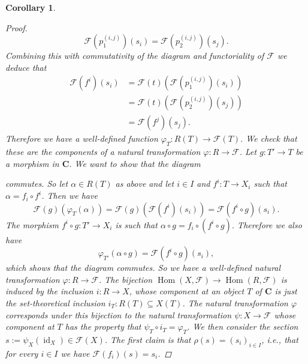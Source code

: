 \documentclass[12pt,reqno,a4paper]{amsart}
\theoremstyle{plain}
\newtheorem{cor}[thm]{Corollary}
\theoremstyle{definition}
\theoremstyle{remark}
\begin{document}
\begin{cor}
\begin{proof}
    \[ \mathscr{F}(p_{1}^{(i,j)})(s_{i}) = \mathscr{F}(p_{2}^{(i,j)})(s_{j}). \]
    Combining this with commutativity of the diagram and functoriality of $\mathscr{F}$ we deduce that
    \begin{align*}
      \mathscr{F}(f^{i})(s_{i}) & = \mathscr{F}(t)(\mathscr{F}(p_{1}^{(i,j)})(s_{i})) \\
      & = \mathscr{F}(t)(\mathscr{F}(p_{2}^{(i,j)})(s_{j})) \\
      & = \mathscr{F}(f^{j})(s_{j}).
    \end{align*}
    Therefore we have a well-defined function $\varphi_{T} \colon R(T) \to \mathscr{F}(T)$.
    We check that these are the components of a natural transformation $\varphi \colon R \to \mathscr{F}$.
    Let $g \colon T' \to T$ be a morphism in $\mathbf{C}$.
    We want to show that the diagram
    \begin{center}
    \end{center}
    commutes.
    So let $\alpha \in R(T)$ as above and let $i \in I$ and $f^{i} \colon T \to X_{i}$ such that $\alpha = f_{i} \circ f^{i}$.
    Then we have
    \[ \mathscr{F}(g)(\varphi_{T}(\alpha)) = \mathscr{F}(g)(\mathscr{F}(f^{i})(s_{i})) = \mathscr{F}(f^{i}\circ g)(s_{i}). \]
    The morphism $f^{i} \circ g \colon T' \to X_{i}$ is such that $\alpha \circ g= f_{i} \circ (f^{i} \circ g)$.
    Therefore we also have
    \[ \varphi_{T'}(\alpha \circ g) = \mathscr{F}(f^{i} \circ g)(s_{i}), \]
    which shows that the diagram commutes.
    So we have a well-defined natural transformation $\varphi \colon R \to \mathscr{F}$.
    The bijection $\operatorname{Hom}(X,\mathscr{F}) \to \operatorname{Hom}(R,\mathscr{F})$ is induced by the inclusion $i \colon R \to X$, whose component at an object $T$ of $\mathbf{C}$ is just the set-theoretical inclusion $i_{T} \colon R(T) \subseteq X(T)$.
    The natural transformation $\varphi$ corresponds under this bijection to the natural transformation $\psi \colon X \to \mathscr{F}$ whose component at $T$ has the property that $\psi_{T} \circ i_{T} = \varphi_{T}$.
    We then consider the section $s := \psi_{X}(\operatorname{id}_{X}) \in \mathscr{F}(X)$.
    The first claim is that $\rho(s) = (s_{i})_{i \in I}$, i.e., that for every $i \in I$ we have $\mathscr{F}(f_{i})(s) = s_{i}$.

\end{proof}
\end{cor}
\end{document}
